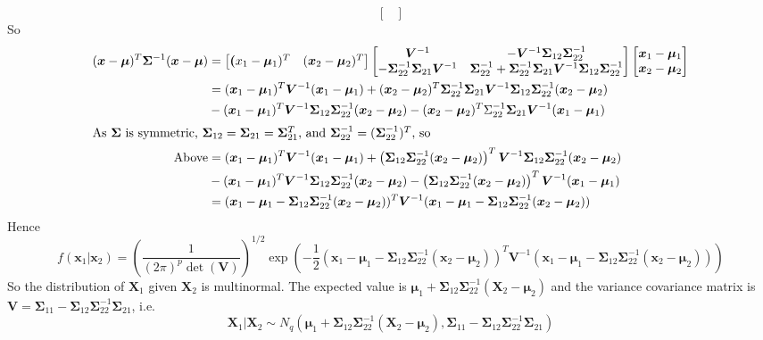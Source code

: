 \documentclass{article}
\begin{document}
\begin{enumerate}[leftmargin = 0 em, label = \arabic*., font = \bfseries]
\begin{enumerate}
\[\begin{bmatrix}
	\end{bmatrix}\]
	So
	\begin{align*}
	(\bm x - \bm \mu)^{T} \bm \Sigma^{-1} (\bm x - \bm \mu) & = \begin{bmatrix}
		\bm (x_1 - \bm \mu_1)^{T} & (\bm x_2 - \bm \mu_2)^T
	\end{bmatrix} \begin{bmatrix}
		\bm V^{-1} & - \bm V^{-1} \bm \Sigma_{12} \bm \Sigma_{22}^{-1}\\
		- \bm \Sigma_{22}^{-1} \bm \Sigma_{21} \bm V^{-1} & \bm \Sigma_{22}^{-1} + \bm \Sigma_{22}^{-1} \bm \Sigma_{21} \bm V^{-1} \bm \Sigma_{12} \bm \Sigma_{22}^{-1}
	\end{bmatrix} \begin{bmatrix}
		\bm x_1 - \bm \mu_1 \\ \bm x_2 - \bm \mu_2
	\end{bmatrix}\\
	& = (\bm x_1 - \bm \mu_1)^T \bm V^{-1} (\bm x_1 - \bm \mu_1) + (\bm x_2 - \bm \mu_2)^T \bm \Sigma_{22}^{-1} \bm \Sigma_{21} \bm V^{-1} \bm \Sigma_{12} \bm \Sigma_{22}^{-1} (\bm x_2 - \bm \mu_2) \\
	& - (\bm x_1 - \bm \mu_1)^T \bm V^{-1} \bm \Sigma_{12} \bm \Sigma_{22}^{-1} (\bm x_2 - \bm \mu_2)- (\bm x_2 - \bm \mu_2)^T \Sigma_{22}^{-1} \bm \Sigma_{21} \bm V^{-1} (\bm x_1 - \bm \mu_1) \\
	\intertext{As $\bm \Sigma$ is symmetric, $\bm \Sigma_{12} = \bm \Sigma_{21} = \bm \Sigma_{21}^T$, and $\bm \Sigma_{22}^{-1} = (\bm \Sigma_{22}^{-1})^{T}$, so}
	\mathrm{Above}& = (\bm x_1 - \bm \mu_1)^T \bm V^{-1} (\bm x_1 - \bm \mu_1) + \left(\bm \Sigma_{12} \bm \Sigma_{22}^{-1} (\bm x_2 - \bm \mu_2)\right)^{T} \bm V^{-1} \bm \Sigma_{12} \bm \Sigma_{22}^{-1} (\bm x_2 - \bm \mu_2) \\
	& - (\bm x_1 - \bm \mu_1)^T \bm V^{-1} \bm \Sigma_{12} \bm \Sigma_{22}^{-1} (\bm x_2 - \bm \mu_2)- \left(\bm \Sigma_{12} \bm \Sigma_{22}^{-1} (\bm x_2 - \bm \mu_2)\right)^{T} \bm V^{-1} (\bm x_1 - \bm \mu_1) \\
	& = (\bm x_1 - \bm \mu_1 - \bm \Sigma_{12} \bm \Sigma_{22}^{-1} (\bm x_2 - \bm \mu_2))^T \bm V^{-1} (\bm x_1 - \bm \mu_1 - \bm \Sigma_{12} \bm \Sigma_{22}^{-1} (\bm x_2 - \bm \mu_2))
	\end{align*}
	Hence
	\[f(\bm x_1 | \bm x_2) = \left(\frac{1}{(2 \pi)^{p} \det (\bm V)}\right)^{1/2} \exp\left(-\frac{1}{2}(\bm x_1 - \bm \mu_1 - \bm \Sigma_{12} \bm \Sigma_{22}^{-1} (\bm x_2 - \bm \mu_2))^T \bm V^{-1} (\bm x_1 - \bm \mu_1 - \bm \Sigma_{12} \bm \Sigma_{22}^{-1} (\bm x_2 - \bm \mu_2))\right)\]
	So the distribution of $\bm X_1$ given $\bm X_2$ is multinormal. The expected value is $\bm \mu_1 + \bm \Sigma_{12} \bm \Sigma_{22}^{-1} (\bm X_2 - \bm \mu_2)$ and the variance covariance matrix is $\bm V = \bm \Sigma_{11} - \bm \Sigma_{12} \bm \Sigma_{22}^{-1} \bm \Sigma_{21}$, i.e.
	\[ \bm X_1 | \bm X_2 \sim N_q(\bm \mu_1 + \bm \Sigma_{12} \bm \Sigma_{22}^{-1} (\bm X_2 - \bm \mu_2), \bm \Sigma_{11} - \bm \Sigma_{12} \bm \Sigma_{22}^{-1} \bm \Sigma_{21})\]


\end{enumerate}
\end{enumerate}
\end{document}
